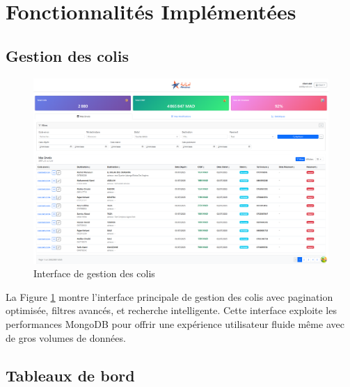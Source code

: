 \section{Fonctionnalités Implémentées}

\subsection{Gestion des colis}

\begin{figure}[H]
\centering
\includegraphics[width=1.0\textwidth]{images/colis_list_interface.png}
\caption{Interface de gestion des colis}
\label{fig:colis_list_interface}
\end{figure}

La Figure \ref{fig:colis_list_interface} montre l'interface principale de gestion des colis avec pagination optimisée, filtres avancés, et recherche intelligente. Cette interface exploite les performances MongoDB pour offrir une expérience utilisateur fluide même avec de gros volumes de données.

\subsection{Tableaux de bord}

